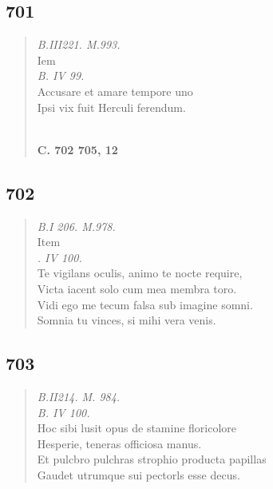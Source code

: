 \documentclass[11pt, a4paper]{report}
\begin{document}
            \subsection*{701}
      \begin{verse}
      \textit{B.III221. M.993.} \\ Iem \\ \textit{B. IV 99.} \\ Accusare et amare tempore uno \\ Ipsi vix fuit Herculi ferendum. \\ 
        ﻿\pagebreak 
    \begin{center} \textbf{C. 702 705, 12} \end{center} \marginpar{[172]} 
      \end{verse}
  
            \subsection*{702}
      \begin{verse}
      \textit{B.I 206. M.978.} \\ Item \\ \textit{. IV 100.} \\ Te vigilans oculis, animo te nocte require, \\ Victa iacent solo cum mea membra toro. \\ Vidi ego me tecum falsa sub imagine somni. \\ Somnia tu vinces, si mihi vera venis. \\ 
      \end{verse}
  
            \subsection*{703}
      \begin{verse}
      \textit{B.II214. M. 984.} \\ \textit{B. IV 100.} \\ Hoc sibi lusit opus de stamine floricolore \\ Hesperie, teneras officiosa manus. \\ Et pulcbro pulchras strophio producta papillas \\ Gaudet utrumque sui pectorls esse decus. \\ 
      \end{verse}
  
\end{document}

